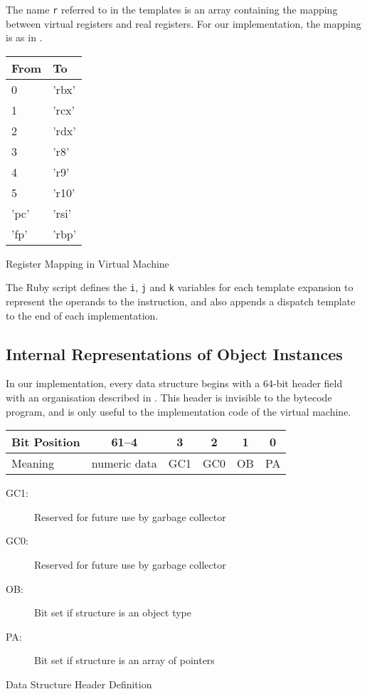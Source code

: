 		The name \texttt{r} referred to in the templates is an array containing the mapping between virtual registers and real registers. For our implementation, the mapping is as in .
		
		\begin{myfigure}
			\begin{tabular}{|l|l|}
				\hline
				From & To \\
				\hline
				0 & 'rbx' \\
				\hline
				1 & 'rcx' \\
				\hline
				2 & 'rdx' \\
				\hline
				3 & 'r8' \\
				\hline
				4 & 'r9' \\
				\hline
				5 & 'r10' \\
				\hline
				'pc' & 'rsi' \\
				\hline
				'fp' & 'rbp' \\ 
				\hline
			\end{tabular}
			\caption{Register Mapping in Virtual Machine}
			\label{fig:regmap}
		\end{myfigure}
		
		The Ruby script defines the \texttt{i}, \texttt{j} and \texttt{k} variables for each template expansion to represent the operands to the instruction, and also appends a dispatch template to the end of each implementation.
		
		\clearpage
		\subsection{Internal Representations of Object Instances}
		In our implementation, every data structure begins with a 64-bit header field with an organisation described in . This header is invisible to the bytecode program, and is only useful to the implementation code of the virtual machine.
		
		\begin{myfigure}
			\begin{tabular}{|l|c| c| c|c|c|}
				\hline
				Bit Position & 61--4 & 3 & 2 & 1 & 0 \\
				\hline
				Meaning & numeric data & GC1 & GC0 & OB & PA \\
				\hline
			\end{tabular}
			\newline
			\begin{description}
				\item[GC1:] Reserved for future use by garbage collector
				\item[GC0:] Reserved for future use by garbage collector
				\item[OB:] Bit set if structure is an object type
				\item[PA:] Bit set if structure is an array of pointers
			\end{description}
			
			\caption{Data Structure Header Definition}
			\label{fig:objheader}
		\end{myfigure}
		

